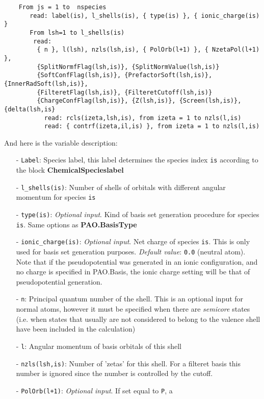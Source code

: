 \begin{description}
\begin{verbatim}
    From js = 1 to  nspecies
       read: label(is), l_shells(is), { type(is) }, { ionic_charge(is) }
       From lsh=1 to l_shells(is)
        read:
         { n }, l(lsh), nzls(lsh,is), { PolOrb(l+1) }, { NzetaPol(l+1) },
         {SplitNormfFlag(lsh,is)}, {SplitNormValue(lsh,is)}
         {SoftConfFlag(lsh,is)}, {PrefactorSoft(lsh,is)}, {InnerRadSoft(lsh,is)},
         {FilteretFlag(lsh,is)}, {FilteretCutoff(lsh,is)}
         {ChargeConfFlag(lsh,is)}, {Z(lsh,is)}, {Screen(lsh,is)}, {delta(lsh,is}
           read: rcls(izeta,lsh,is), from izeta = 1 to nzls(l,is)
           read: { contrf(izeta,il,is) }, from izeta = 1 to nzls(l,is)
\end{verbatim}

\noindent
And here is the variable description:
\begin{itemize}
\item[-] \texttt{Label}: Species label, this label determines
the species index \texttt{is} according to the block \textbf{ChemicalSpecieslabel}
\item[-] \texttt{l\_shells(is)}: Number of shells of orbitals
with different angular momentum for species \texttt{is}
\item[-] \texttt{type(is)}: \textit{Optional input}.
Kind of basis set generation procedure for species \texttt{is}.
Same options as \textbf{PAO.BasisType}
\item[-] \texttt{ionic\_charge(is)}: \textit{Optional input}.
Net charge of species \texttt{is}. This is  only used for
basis set generation purposes. \textit{Default value}: \texttt{0.0} (neutral
atom). Note that if the pseudopotential was generated in an ionic
configuration, and no charge is specified in PAO.Basis, the ionic
charge setting will be that of pseudopotential generation.
\item[-] \texttt{n}: Principal quantum number of the shell. This is an optional
input for normal atoms, however it must be specified when there are
\textit{semicore} states (i.e. when states that usually are not
considered to belong to the
valence shell have been included in the calculation)
\item[-] \texttt{l}: Angular momentum of
basis orbitals of this shell
\item[-] \texttt{nzls(lsh,is)}: Number of 'zetas' for this shell. For a filteret 
basis this number is ignored since the number is controlled by the cutoff.
\item[-] \texttt{PolOrb(l+1)}: \textit{Optional input}. If set equal to \texttt{P}, a

\end{itemize}
\end{description}
